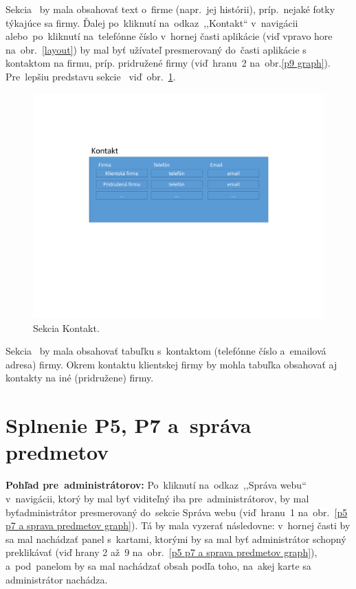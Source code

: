 Sekcia~ by mala obsahovať text o~firme (napr.~jej histórii), príp.~nejaké fotky týkajúce sa firmy. Ďalej po~kliknutí na~odkaz~,,Kontakt`` v~navigácii alebo~po~kliknutí na~telefónne číslo v~hornej časti aplikácie (viď vpravo hore na~obr.~\ref{layout}) by mal byť užívateľ presmerovaný do~časti aplikácie s kontaktom na firmu, príp. pridružené firmy (viď~hranu~2 na~obr.\ref{p9 graph}). Pre~lepšiu predstavu sekcie~ viď~obr.~\ref{contact}.

\begin{figure}[H]\centering
\includegraphics[width=140mm]{../img/UI concept/contact}
\caption{Sekcia Kontakt.}
\label{contact}
\end{figure}

Sekcia~ by mala obsahovať tabuľku s~kontaktom (telefónne číslo a~emailová adresa) firmy. Okrem kontaktu klientskej firmy by mohla tabuľka obsahovať aj kontakty na iné (pridružene) firmy.

\section{Splnenie P5, P7 a~správa predmetov}
\label{splnenie p5 p7 a sprava predmetov}

\textbf{Pohľad pre~administrátorov:} Po~kliknutí na~odkaz~,,Správa webu`` v~navigácii, ktorý by mal byť viditeľný iba pre~administrátorov, by mal byť\linebreak administrátor presmerovaný do~sekcie Správa webu (viď~hranu~1 na~obr.~\ref{p5 p7 a sprava predmetov graph}). Tá by mala vyzerať následovne: v~hornej časti by sa mal nachádzať panel s~kartami, ktorými by sa mal byť administrátor schopný preklikávať (viď hrany 2 až~9 na~obr.~\ref{p5 p7 a sprava predmetov graph}), a~pod~panelom by sa mal nachádzať obsah podľa toho, na~akej karte sa administrátor nachádza.

